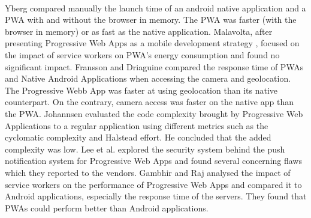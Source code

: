 \documentclass{kththesis}
\begin{document}
\paragraph{}
Yberg \cite{YbergViktor2018NPaU} compared manually the launch time of an android native application and a PWA with and without the browser in memory. The PWA was faster (with the browser in memory) or as fast as the native application. \newline
Malavolta, after presenting Progressive Web Apps as a mobile development strategy \cite{malavolta2016beyond}, focused on the impact of service workers on PWA's energy consumption and found no significant impact\cite{SW_and_energy}. \newline
Fransson and Driaguine \cite{PWAbc_responsetime} compared the response time of PWAs and Native Android Applications when accessing the camera and geolocation. The Progressive Webb App was faster at using geolocation than its native counterpart. On the contrary, camera access was faster on the native app than the PWA. \newline
Johannsen \cite{JohannsenFabian2018PWAa} evaluated the code complexity brought by Progressive Web Applications to a regular application using different metrics such as the cyclomatic complexity and Halstead effort. He concluded that the added complexity was low. \newline
Lee et al. \cite{Pride_Prejudice} explored the security system behind the push notification system for Progressive Web Apps and found several concerning flaws which they reported to the vendors. \newline
Gambhir and Raj \cite{gambhir2018analysis} analysed the impact of service workers on the performance of Progressive Web Apps and compared it to Android applications, especially the response time of the servers. They found that PWAs could perform better than Android applications. \newline
\end{document}
